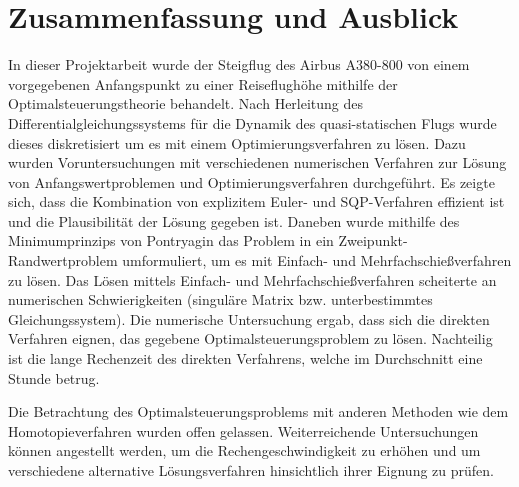 \chapter{Zusammenfassung und Ausblick}

In dieser Projektarbeit wurde der Steigflug des Airbus A380-800 von einem vorgegebenen Anfangspunkt zu einer Reiseflughöhe mithilfe der Optimalsteuerungstheorie behandelt.  Nach Herleitung des Differentialgleichungssystems  für die Dynamik des quasi-statischen Flugs wurde dieses diskretisiert um es mit einem Optimierungsverfahren zu lösen. Dazu wurden Voruntersuchungen mit verschiedenen numerischen Verfahren zur Lösung von Anfangswertproblemen und Optimierungsverfahren durchgeführt. Es zeigte sich, dass die Kombination von explizitem Euler- und SQP-Verfahren effizient ist und die Plausibilität der Lösung gegeben ist. Daneben wurde mithilfe des Minimumprinzips von Pontryagin das Problem in ein Zweipunkt-Randwertproblem umformuliert, um es mit Einfach- und Mehrfachschießverfahren zu lösen. Das Lösen mittels Einfach- und Mehrfachschießverfahren scheiterte an numerischen Schwierigkeiten (singuläre Matrix bzw. unterbestimmtes Gleichungssystem). Die numerische Untersuchung ergab, dass sich die direkten Verfahren eignen, das gegebene Optimalsteuerungsproblem zu lösen.  Nachteilig ist die lange Rechenzeit des direkten Verfahrens, welche im Durchschnitt eine Stunde betrug. 

Die Betrachtung des Optimalsteuerungsproblems mit anderen Methoden wie dem Homotopieverfahren wurden offen gelassen. Weiterreichende Untersuchungen können angestellt werden, um die Rechengeschwindigkeit zu erhöhen und um verschiedene alternative Lösungsverfahren hinsichtlich ihrer Eignung zu prüfen.